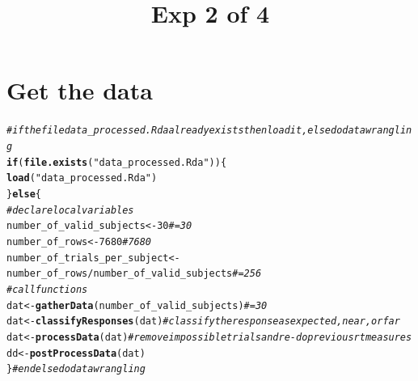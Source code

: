 \documentclass[a4paper,12pt]{article}\usepackage[]{graphicx}\usepackage[]{color}
\title{Exp 2 of 4}
\makeatletter
\newcommand{\hlnum}[1]{\textcolor[rgb]{0.686,0.059,0.569}{#1}}%
\newcommand{\hlstr}[1]{\textcolor[rgb]{0.192,0.494,0.8}{#1}}%
\newcommand{\hlcom}[1]{\textcolor[rgb]{0.678,0.584,0.686}{\textit{#1}}}%
\newcommand{\hlopt}[1]{\textcolor[rgb]{0,0,0}{#1}}%
\newcommand{\hlstd}[1]{\textcolor[rgb]{0.345,0.345,0.345}{#1}}%
\newcommand{\hlkwa}[1]{\textcolor[rgb]{0.161,0.373,0.58}{\textbf{#1}}}%
\newcommand{\hlkwb}[1]{\textcolor[rgb]{0.69,0.353,0.396}{#1}}%
\newcommand{\hlkwd}[1]{\textcolor[rgb]{0.737,0.353,0.396}{\textbf{#1}}}%
\newenvironment{kframe}{%
 \def\at@end@of@kframe{}%
 \ifinner\ifhmode%
  \def\at@end@of@kframe{\end{minipage}}%
  \begin{minipage}{\columnwidth}%
 \fi\fi%
 \def\FrameCommand##1{\hskip\@totalleftmargin \hskip-\fboxsep
 \colorbox{shadecolor}{##1}\hskip-\fboxsep
     \hskip-\linewidth \hskip-\@totalleftmargin \hskip\columnwidth}%
 \MakeFramed {\advance\hsize-\width
   \@totalleftmargin\z@ \linewidth\hsize
   \@setminipage}}%
 {\par\unskip\endMakeFramed%
 \at@end@of@kframe}
\newenvironment{knitrout}{}{} %
\makeatother
\begin{document}
\maketitle
\tableofcontents
\clearpage














\clearpage
\section{Get the data}

\begin{knitrout}\scriptsize
{}\color{fgcolor}\begin{kframe}
\begin{alltt}
\hlcom{# if the file data_processed.Rda already exists then load it, else do data wrangling}
\hlkwa{if} \hlstd{(}\hlkwd{file.exists}\hlstd{(}\hlstr{"data_processed.Rda"}\hlstd{)) \{}
    \hlkwd{load}\hlstd{(}\hlstr{"data_processed.Rda"}\hlstd{)}
\hlstd{\}} \hlkwa{else} \hlstd{\{}
    \hlcom{# declare local variables}
    \hlstd{number_of_valid_subjects} \hlkwb{<-} \hlnum{30}  \hlcom{# = 30}
    \hlstd{number_of_rows} \hlkwb{<-} \hlnum{7680}  \hlcom{# 7680}
    \hlstd{number_of_trials_per_subject} \hlkwb{<-} \hlstd{number_of_rows}\hlopt{/}\hlstd{number_of_valid_subjects}  \hlcom{# = 256}
    \hlcom{# call functions}
    \hlstd{dat} \hlkwb{<-} \hlkwd{gatherData}\hlstd{(number_of_valid_subjects)}  \hlcom{# = 30}
    \hlstd{dat} \hlkwb{<-} \hlkwd{classifyResponses}\hlstd{(dat)}  \hlcom{# classify the response as expected, near, or far}
    \hlstd{dat} \hlkwb{<-} \hlkwd{processData}\hlstd{(dat)}  \hlcom{# remove impossible trials and re-do previous rt measures}
    \hlstd{dd} \hlkwb{<-} \hlkwd{postProcessData}\hlstd{(dat)}
\hlstd{\}}  \hlcom{# end else do data wrangling}
\end{alltt}
\end{kframe}
\end{knitrout}
\end{document}

